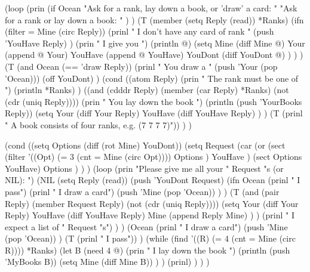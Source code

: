 \begin{wideverbatim}

         (loop
            (prin
               (if Ocean
                  "Ask for a rank, lay down a book, or 'draw' a card: "
                  "Ask for a rank or lay down a book: " ) )
            (T (member (setq Reply (read)) *Ranks)
               (ifn (filter = Mine (circ Reply))
                  (prinl
                     "   I don't have any card of rank "
                     (push 'YouHave Reply) )
                  (prin "   I give you ")
                  (println @)
                  (setq
                     Mine (diff Mine @)
                     Your (append @ Your)
                     YouHave (append @ YouHave)
                     YouDont (diff YouDont @) ) ) )
            (T (and Ocean (== 'draw Reply))
               (prinl "   You draw a " (push 'Your (pop 'Ocean)))
               (off YouDont) )
            (cond
               ((atom Reply)
                  (prin "   The rank must be one of ")
                  (println *Ranks) )
               ((and (cdddr Reply) (member (car Reply) *Ranks) (not (cdr (uniq Reply))))
                  (prin "   You lay down the book ")
                  (println (push 'YourBooks Reply))
                  (setq
                     Your (diff Your Reply)
                     YouHave (diff YouHave Reply) ) )
               (T (prinl "   A book consists of four ranks, e.g. (7 7 7 7)")) ) )

\end{wideverbatim}

\begin{wideverbatim}

         (cond
            ((setq Options (diff (rot Mine) YouDont))
               (setq Request
                  (car
                     (or
                        (sect
                           (filter
                              '((Opt) (= 3 (cnt = Mine (circ Opt))))
                              Options )
                           YouHave )
                        (sect Options YouHave)
                        Options ) ) )
               (loop
                  (prin "Please give me all your " Request "s (or NIL): ")
                  (NIL (setq Reply (read))
                     (push 'YouDont Request)
                     (ifn Ocean
                        (prinl "   I pass")
                        (prinl "   I draw a card")
                        (push 'Mine (pop 'Ocean)) ) )
                  (T (and (pair Reply) (member Request Reply) (not (cdr (uniq Reply))))
                     (setq
                        Your (diff Your Reply)
                        YouHave (diff YouHave Reply)
                        Mine (append Reply Mine) ) )
                  (prinl "   I expect a list of " Request "s") ) )
            (Ocean
               (prinl "   I draw a card")
               (push 'Mine (pop 'Ocean)) )
            (T (prinl "   I pass")) )
         (while (find '((R) (= 4 (cnt = Mine (circ R)))) *Ranks)
            (let B (need 4 @)
               (prin "   I lay down the book ")
               (println (push 'MyBooks B))
               (setq Mine (diff Mine B)) ) )
         (prinl) ) ) )

\end{wideverbatim}

